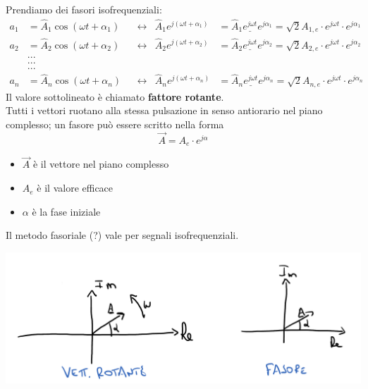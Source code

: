 \documentclass{article}
\begin{document}
Prendiamo dei fasori isofrequenziali:
\begin{align*}
    a_1&=\hat A_1\cos(\omega t + \alpha_1) & &\longleftrightarrow & \hat A_1 e^{j(\omega t + \alpha_1)} &= \hat A_1 \underline{e^{j \omega t}}e^{j \alpha_1}=\sqrt{2}A_{1,e} \cdot e^{j \omega t} \cdot e^{j \alpha_1}\\
    a_2&=\hat A_2\cos(\omega t + \alpha_2) & &\longleftrightarrow & \hat A_2 e^{j(\omega t + \alpha_2)} &= \hat A_2 \underline{e^{j \omega t}}e^{j \alpha_2}=\sqrt{2}A_{2,e} \cdot e^{j \omega t} \cdot e^{j \alpha_2}\\
    &...\\
    &...\\
    &...\\
    a_n&=\hat A_n\cos(\omega t + \alpha_n) & &\longleftrightarrow & \hat A_n e^{j(\omega t + \alpha_n)} &= \hat A_n \underline{e^{j \omega t}}e^{j \alpha_n}=\sqrt{2}A_{n,e} \cdot e^{j \omega t} \cdot e^{j \alpha_n}
\end{align*}
Il valore sottolineato è chiamato \textbf{fattore rotante}.
\vspace*{0.1cm}\\
Tutti i vettori ruotano alla stessa pulsazione in senso antiorario nel piano complesso; un fasore può essere scritto nella forma
\[
    \vec A = A_e \cdot e^{j \alpha}
\]
\begin{itemize}
    \item $\vec A$ è il vettore nel piano complesso
    \item $A_e$ è il valore efficace
    \item $\alpha$ è la fase iniziale
\end{itemize}
Il metodo fasoriale (?) vale per segnali isofrequenziali.
\begin{center}
    \includegraphics[scale=0.2]{Image/Regime_sinusoidale_5.png}
\end{center}
\end{document}
